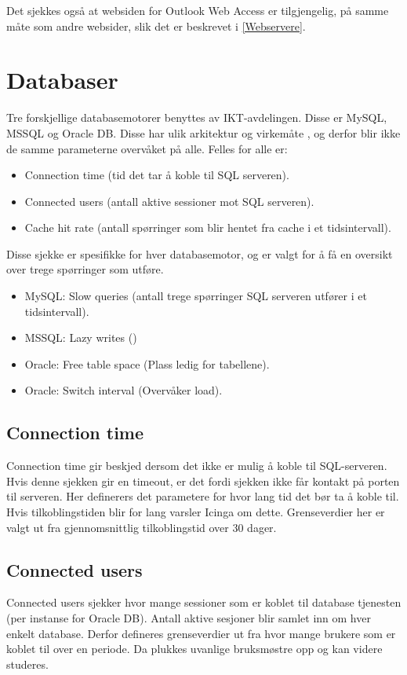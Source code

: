 Det sjekkes også at websiden for Outlook Web Access er tilgjengelig, på samme måte som andre websider, slik det er beskrevet i \ref{Webservere}.
\section{Databaser}
Tre forskjellige databasemotorer benyttes av IKT-avdelingen. Disse er MySQL, MSSQL og Oracle DB. Disse har ulik arkitektur og virkemåte \cite{databasecomparison}, og derfor blir ikke de samme parameterne overvåket på alle. Felles for alle er:

\begin{itemize}
	\item Connection time (tid det tar å koble til SQL serveren).
	\item Connected users (antall aktive sessioner mot SQL serveren).
	\item Cache hit rate (antall spørringer som blir hentet fra cache i et tidsintervall).
\end{itemize}

Disse sjekke er spesifikke for hver databasemotor, og er valgt for å få en oversikt over trege spørringer som utføre.

\begin{itemize}
\item MySQL: Slow queries (antall trege spørringer SQL serveren utfører i et tidsintervall).
\item MSSQL: Lazy writes ()
\item Oracle: Free table space (Plass ledig for tabellene).
\item Oracle: Switch interval (Overvåker load).
\end{itemize}

\subsection*{Connection time}
Connection time gir beskjed dersom det ikke er mulig å koble til SQL-serveren. Hvis denne sjekken gir en timeout, er det fordi sjekken ikke får kontakt på porten til serveren. Her definerers det parametere for hvor lang tid det bør ta å koble til. Hvis tilkoblingstiden blir for lang varsler Icinga om dette. Grenseverdier her er valgt ut fra gjennomsnittlig tilkoblingstid over 30 dager.

\subsection*{Connected users}
Connected users sjekker hvor mange sessioner som er koblet til database tjenesten (per instanse for Oracle DB). Antall aktive sesjoner blir samlet inn om hver enkelt database. Derfor defineres grenseverdier ut fra hvor mange brukere som er koblet til over en periode. Da plukkes uvanlige bruksmøstre opp og kan videre studeres.

